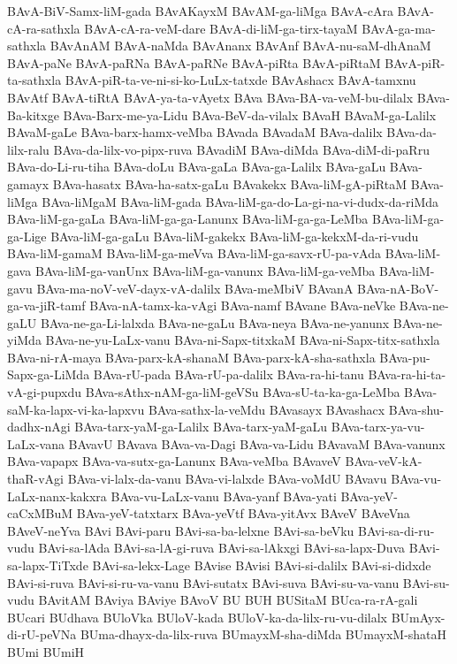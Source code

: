 {BAvA-BiV-Samx-liM-gada
BAvAKayxM
BAvAM-ga-liMga
BAvA-cAra
BAvA-cA-ra-sathxla
BAvA-cA-ra-veM-dare
BAvA-di-liM-ga-tirx-tayaM
BAvA-ga-ma-sathxla
BAvAnAM
BAvA-naMda
BAvAnanx
BAvAnf
BAvA-nu-saM-dhAnaM
BAvA-paNe
BAvA-paRNa
BAvA-paRNe
BAvA-piRta
BAvA-piRtaM
BAvA-piR-ta-sathxla
BAvA-piR-ta-ve-ni-si-ko-LuLx-tatxde
BAvAshacx
BAvA-tamxnu
BAvAtf
BAvA-tiRtA
BAvA-ya-ta-vAyetx
BAva
BAva-BA-va-veM-bu-dilalx
BAva-Ba-kitxge
BAva-Barx-me-ya-Lidu
BAva-BeV-da-vilalx
BAvaH
BAvaM-ga-Lalilx
BAvaM-gaLe
BAva-barx-hamx-veMba
BAvada
BAvadaM
BAva-dalilx
BAva-da-lilx-ralu
BAva-da-lilx-vo-pipx-ruva
BAvadiM
BAva-diMda
BAva-diM-di-paRru
BAva-do-Li-ru-tiha
BAva-doLu
BAva-gaLa
BAva-ga-Lalilx
BAva-gaLu
BAva-gamayx
BAva-hasatx
BAva-ha-satx-gaLu
BAvakekx
BAva-liM-gA-piRtaM
BAva-liMga
BAva-liMgaM
BAva-liM-gada
BAva-liM-ga-do-La-gi-na-vi-dudx-da-riMda
BAva-liM-ga-gaLa
BAva-liM-ga-ga-Lanunx
BAva-liM-ga-ga-LeMba
BAva-liM-ga-ga-Lige
BAva-liM-ga-gaLu
BAva-liM-gakekx
BAva-liM-ga-kekxM-da-ri-vudu
BAva-liM-gamaM
BAva-liM-ga-meVva
BAva-liM-ga-savx-rU-pa-vAda
BAva-liM-gava
BAva-liM-ga-vanUnx
BAva-liM-ga-vanunx
BAva-liM-ga-veMba
BAva-liM-gavu
BAva-ma-noV-veV-dayx-vA-dalilx
BAva-meMbiV
BAvanA
BAva-nA-BoV-ga-va-jiR-tamf
BAva-nA-tamx-ka-vAgi
BAva-namf
BAvane
BAva-neVke
BAva-ne-gaLU
BAva-ne-ga-Li-lalxda
BAva-ne-gaLu
BAva-neya
BAva-ne-yanunx
BAva-ne-yiMda
BAva-ne-yu-LaLx-vanu
BAva-ni-Sapx-titxkaM
BAva-ni-Sapx-titx-sathxla
BAva-ni-rA-maya
BAva-parx-kA-shanaM
BAva-parx-kA-sha-sathxla
BAva-pu-Sapx-ga-LiMda
BAva-rU-pada
BAva-rU-pa-dalilx
BAva-ra-hi-tanu
BAva-ra-hi-ta-vA-gi-pupxdu
BAva-sAthx-nAM-ga-liM-geVSu
BAva-sU-ta-ka-ga-LeMba
BAva-saM-ka-lapx-vi-ka-lapxvu
BAva-sathx-la-veMdu
BAvasayx
BAvashacx
BAva-shu-dadhx-nAgi
BAva-tarx-yaM-ga-Lalilx
BAva-tarx-yaM-gaLu
BAva-tarx-ya-vu-LaLx-vana
BAvavU
BAvava
BAva-va-Dagi
BAva-va-Lidu
BAvavaM
BAva-vanunx
BAva-vapapx
BAva-va-sutx-ga-Lanunx
BAva-veMba
BAvaveV
BAva-veV-kA-thaR-vAgi
BAva-vi-lalx-da-vanu
BAva-vi-lalxde
BAva-voMdU
BAvavu
BAva-vu-LaLx-nanx-kakxra
BAva-vu-LaLx-vanu
BAva-yanf
BAva-yati
BAva-yeV-caCxMBuM
BAva-yeV-tatxtarx
BAva-yeVtf
BAva-yitAvx
BAveV
BAveVna
BAveV-neYva
BAvi
BAvi-paru
BAvi-sa-ba-lelxne
BAvi-sa-beVku
BAvi-sa-di-ru-vudu
BAvi-sa-lAda
BAvi-sa-lA-gi-ruva
BAvi-sa-lAkxgi
BAvi-sa-lapx-Duva
BAvi-sa-lapx-TiTxde
BAvi-sa-lekx-Lage
BAvise
BAvisi
BAvi-si-dalilx
BAvi-si-didxde
BAvi-si-ruva
BAvi-si-ru-va-vanu
BAvi-sutatx
BAvi-suva
BAvi-su-va-vanu
BAvi-su-vudu
BAvitAM
BAviya
BAviye
BAvoV
BU
BUH
BUSitaM
BUca-ra-rA-gali
BUcari
BUdhava
BUloVka
BUloV-kada
BUloV-ka-da-lilx-ru-vu-dilalx
BUmAyx-di-rU-peVNa
BUma-dhayx-da-lilx-ruva
BUmayxM-sha-diMda
BUmayxM-shataH
BUmi
BUmiH
}
